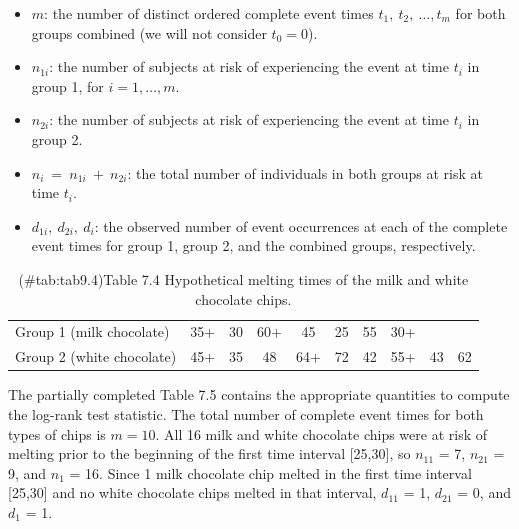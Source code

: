 \documentclass[
]{report}
\providecommand{\tightlist}{%
  \setlength{\itemsep}{0pt}\setlength{\parskip}{0pt}}
\begin{document}
\begin{itemize}
\tightlist
\item
  \(\scriptstyle m\): the number of distinct ordered complete event times \(\scriptstyle t_1, \ t_2,\  \dots, t_m\) for both groups combined (we will not consider \(t_0 = 0\)).
\item
  \(\scriptstyle n_{1i}\): the number of subjects at risk of experiencing the event at time \(t_i\) in group 1, for \(i = 1,\dots,m\).\\
\item
  \(\scriptstyle n_{2i}\): the number of subjects at risk of experiencing the event at time \(t_i\) in group 2.\\
\item
  \(\scriptstyle n_i \ =\  n_{1i} \ +\  n_{2i}\): the total number of individuals in both groups at risk at time \(t_i\).\\
\item
  \(\scriptstyle d_{1i}, \ d_{2i}, \ d_i\): the observed number of event occurrences at each of the complete event times for group 1, group 2, and the combined groups, respectively.
\end{itemize}

\begin{table}[!h]
\centering
\caption{(\#tab:tab9.4)Table 7.4 Hypothetical melting times of the milk and white chocolate chips.}
\centering
\begin{tabular}[t]{llcccccccc}
\toprule
  &  &  &  &  &  &  &  &  & \\
\midrule
Group 1 (milk chocolate) & 35+ & 30 & 60+ & 45 & 25 & 55 & 30+ &  & \\
Group 2 (white chocolate) & 45+ & 35 & 48 & 64+ & 72 & 42 & 55+ & 43 & 62\\
\bottomrule
\end{tabular}
\end{table}

The partially completed Table 7.5 contains the appropriate quantities to compute the log-rank test statistic. The total number of complete event times for both types of chips is \(m = 10\). All 16 milk and white chocolate chips were at risk of melting prior to the beginning of the first time interval {[}25,30{]}, so \(\scriptstyle n_{11}\) = 7, \(\scriptstyle n_{21}\) = 9, and \(\scriptstyle n_1\) = 16. Since 1 milk chocolate chip melted in the first time interval {[}25,30{]} and no white chocolate chips melted in that interval, \(\scriptstyle d_{11}\) = 1, \(\scriptstyle d_{21}\) = 0, and \(\scriptstyle d_1\) = 1.
\end{document}
